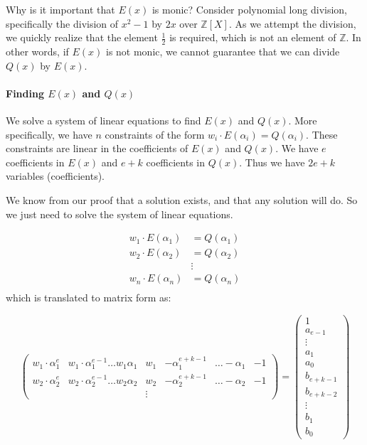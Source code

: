 \begin{bclogo}[logo=\bcquestion]{Why is it important that $E(x)$ is monic?}
    Consider polynomial long division, specifically 
    the division of $x^2-1$ by $2x$ over $\mathbb{Z}[X]$. 
    As we attempt the division, we quickly realize that the element 
    $\frac{1}{2}$ is required, which is not an element of $\mathbb{Z}$. 
    In other words, if $E(x)$ is not monic, we cannot guarantee that we can divide $Q(x)$ by $E(x)$.
\end{bclogo}

\paragraph{Finding $E(x)$ and $Q(x)$}

We solve a system of linear equations to find $E(x)$ and $Q(x)$.
More specifically, we have $n$ constraints of the form $w_i\cdot E(\alpha_i)=Q(\alpha_i)$.
These constraints are linear in the coefficients of $E(x)$ and $Q(x)$.
We have $e$ coefficients in $E(x)$ and $e+k$ coefficients in $Q(x)$. Thus 
we have $2e+k$ variables (coefficients).

We know from our proof that a solution exists, and that any solution will do.
So we just need to solve the system of linear equations.

\begin{align*}
    w_1\cdot E(\alpha_1) &= Q(\alpha_1)\\
    w_2\cdot E(\alpha_2) &= Q(\alpha_2)\\
    &\vdots\\
    w_n\cdot E(\alpha_n) &= Q(\alpha_n)\\
\end{align*}
which is translated to matrix form as:

\[
    \left(\begin{array}{ccc|lcc}
        w_{1}\cdot\alpha_{1}^{e} & w_{1}\cdot\alpha_{1}^{e-1}\dots w_{1}\alpha_{1} & w_{1} & -\alpha_{1}^{e+k-1} & \dots-\alpha_{1} & -1\\
        w_{2}\cdot\alpha_{2}^{e} & w_{2}\cdot\alpha_{2}^{e-1}\dots w_{2}\alpha_{2} & w_{2} & -\alpha_{2}^{e+k-1} & \dots-\alpha_{2} & -1\\
         &  & \vdots
        \end{array}\right)=\left(\begin{array}{c}
        1\\
        a_{e-1}\\
        \vdots\\
        a_{1}\\
        a_{0}\\
        \hline b_{e+k-1}\\
        b_{e+k-2}\\
        \vdots\\
        b_{1}\\
        b_{0}
        \end{array}\right)
\]

